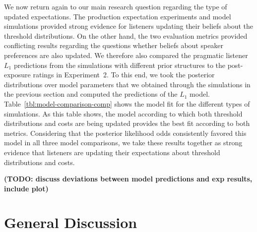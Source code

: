 \documentclass[lucida,biblatex]{sp} %
\newcommand{\tableref}[1]{Table~\ref{#1}}
\newcommand{\todo}[1]{}
\renewcommand{\todo}[1]{{\bf \color{red} (TODO: {#1})}}
\begin{document}
We now return again to our main research question regarding the type of updated expectations. The production expectation experiments and model simulations provided strong evidence for listeners updating 
their beliefs about the threshold distributions. On the other hand, the two evaluation metrics provided conflicting results regarding the questions whether beliefs about speaker preferences are also updated.
We therefore also compared the pragmatic listener $L_1$ predictions from the simulations with different prior structures to the post-exposure ratings in Experiment~2. To this end, we took the
posterior distributions over model parameters that we obtained through the simulations in the previous section and computed the predictions of the $L_1$ model. \tableref{tbl:model-comparison-comp} shows the model fit
for the different types of simulations. As this table shows, the model according to which both threshold distributions and costs are being updated provides the best fit according to both metrics. 
Considering that the posterior likelihood odds consistently favored this model in all three model comparisons, we take these results together as strong evidence that listeners are updating their expectations about threshold distributions
and costs. 

\todo{discuss deviations between model predictions and exp results, include plot}

\section{General Discussion}
\end{document}
